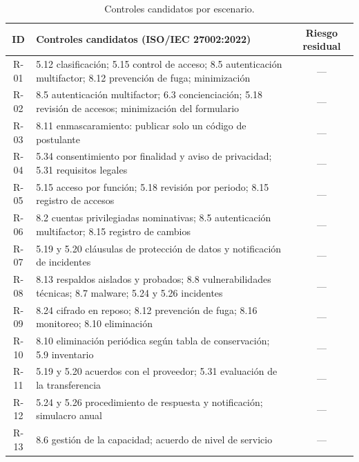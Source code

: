 \begin{table}[htbp]
  \centering
  \caption{Controles candidatos por escenario.}
  \label{tab:plan_tratamiento}
  \scriptsize
  \renewcommand{\arraystretch}{1.2}
  \begin{tabularx}{\textwidth}{|c|L|c|}
    \hline
    \textbf{ID} & \textbf{Controles candidatos (ISO/IEC 27002:2022)} & \textbf{Riesgo residual} \\
    \hline
    R-01 & 5.12 clasificación; 5.15 control de acceso; 8.5 autenticación multifactor; 8.12 prevención de fuga; minimización & --- \\
    \hline
    R-02 & 8.5 autenticación multifactor; 6.3 concienciación; 5.18 revisión de accesos; minimización del formulario & --- \\
    \hline
    R-03 & 8.11 enmascaramiento: publicar solo un código de postulante & --- \\
    \hline
    R-04 & 5.34 consentimiento por finalidad y aviso de privacidad; 5.31 requisitos legales & --- \\
    \hline
    R-05 & 5.15 acceso por función; 5.18 revisión por periodo; 8.15 registro de accesos & --- \\
    \hline
    R-06 & 8.2 cuentas privilegiadas nominativas; 8.5 autenticación multifactor; 8.15 registro de cambios & --- \\
    \hline
    R-07 & 5.19 y 5.20 cláusulas de protección de datos y notificación de incidentes & --- \\
    \hline
    R-08 & 8.13 respaldos aislados y probados; 8.8 vulnerabilidades técnicas; 8.7 malware; 5.24 y 5.26 incidentes & --- \\
    \hline
    R-09 & 8.24 cifrado en reposo; 8.12 prevención de fuga; 8.16 monitoreo; 8.10 eliminación & --- \\
    \hline
    R-10 & 8.10 eliminación periódica según tabla de conservación; 5.9 inventario & --- \\
    \hline
    R-11 & 5.19 y 5.20 acuerdos con el proveedor; 5.31 evaluación de la transferencia & --- \\
    \hline
    R-12 & 5.24 y 5.26 procedimiento de respuesta y notificación; simulacro anual & --- \\
    \hline
    R-13 & 8.6 gestión de la capacidad; acuerdo de nivel de servicio & --- \\
    \hline
  \end{tabularx}
  \raggedright
\end{table}

